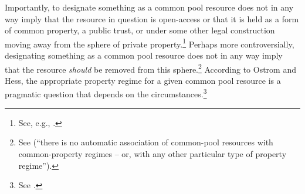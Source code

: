 Importantly, to designate something as a common pool resource does not in any way imply that the resource in question is open-access or that it is held as a form of common property, a public trust, or under some other legal construction moving away from the sphere of private property.\footnote{See, e.g., \cite[58]{ostrom10b}.} Perhaps more controversially, designating something as a common pool resource does not in any way imply that the resource {\it should} be removed from this sphere.\footnote{See \cite[58]{ostrom10b} (``there is no automatic association of common-pool resources with common-property regimes -- or, with any other particular type of property regime'').} According to Ostrom and Hess, the appropriate property regime for a given common pool resource is a pragmatic question that depends on the circumstances.\footnote{See \cite[58]{ostrom10b}.}
